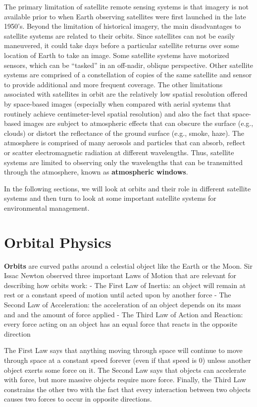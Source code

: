 \documentclass[
]{book}
\begin{document}
The primary limitation of satellite remote sensing systems is that imagery is not available prior to when Earth observing satellites were first launched in the late 1950's. Beyond the limitation of historical imagery, the main disadvantages to satellite systems are related to their orbits. Since satellites can not be easily maneuvered, it could take days before a particular satellite returns over some location of Earth to take an image. Some satellite systems have motorized sensors, which can be ``tasked'' in an off-nadir, oblique perspective. Other satellite systems are comprised of a constellation of copies of the same satellite and sensor to provide additional and more frequent coverage. The other limitations associated with satellites in orbit are the relatively low spatial resolution offered by space-based images (especially when compared with aerial systems that routinely achieve centimeter-level spatial resolution) and also the fact that space-based images are subject to atmospheric effects that can obscure the surface (e.g., clouds) or distort the reflectance of the ground surface (e.g., smoke, haze). The atmosphere is comprised of many aerosols and particles that can absorb, reflect or scatter electromagnetic radiation at different wavelengths. Thus, satellite systems are limited to observing only the wavelengths that can be transmitted through the atmosphere, known as \textbf{atmospheric windows}.

In the following sections, we will look at orbits and their role in different satellite systems and then turn to look at some important satellite systems for environmental management.

\hypertarget{orbital-physics}{%
\section{Orbital Physics}\label{orbital-physics}}

\textbf{Orbits} are curved paths around a celestial object like the Earth or the Moon. Sir Issac Newton observed three important Laws of Motion that are relevant for describing how orbits work:
- The First Law of Inertia: an object will remain at rest or a constant speed of motion until acted upon by another force
- The Second Law of Acceleration: the acceleration of an object depends on its mass and and the amount of force applied
- The Third Law of Action and Reaction: every force acting on an object has an equal force that reacts in the opposite direction

The First Law says that anything moving through space will continue to move through space at a constant speed forever (even if that speed is 0) unless another object exerts some force on it. The Second Law says that objects can accelerate with force, but more massive objects require more force. Finally, the Third Law constrains the other two with the fact that every interaction between two objects causes two forces to occur in opposite directions.
\end{document}
